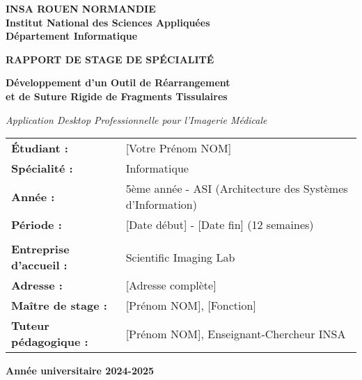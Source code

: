 \documentclass[12pt,a4paper]{report}
\begin{document}
\begin{titlepage}
\centering

\vspace*{1cm}

\textbf{\Large INSA ROUEN NORMANDIE}\\
\textbf{Institut National des Sciences Appliquées}\\
\textbf{Département Informatique}

\vspace{2cm}

{\LARGE \textbf{RAPPORT DE STAGE DE SPÉCIALITÉ}}

\vspace{1.5cm}

{\Large \textbf{Développement d'un Outil de Réarrangement\\et de Suture Rigide de Fragments Tissulaires}}

\vspace{1cm}

{\large \textit{Application Desktop Professionnelle pour l'Imagerie Médicale}}

\vspace{2cm}

\begin{tabular}{ll}
\textbf{Étudiant :} & [Votre Prénom NOM] \\
\textbf{Spécialité :} & Informatique \\
\textbf{Année :} & 5ème année - ASI (Architecture des Systèmes d'Information) \\
\textbf{Période :} & [Date début] - [Date fin] (12 semaines) \\
\\
\textbf{Entreprise d'accueil :} & Scientific Imaging Lab \\
\textbf{Adresse :} & [Adresse complète] \\
\textbf{Maître de stage :} & [Prénom NOM], [Fonction] \\
\textbf{Tuteur pédagogique :} & [Prénom NOM], Enseignant-Chercheur INSA \\
\end{tabular}

\vfill

\textbf{Année universitaire 2024-2025}

\end{titlepage}

\newpage
\thispagestyle{empty}
\mbox{}
\end{document}
